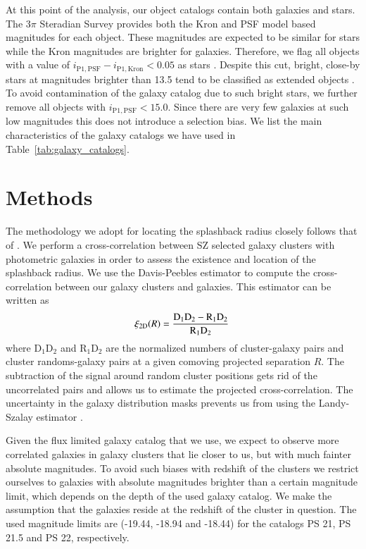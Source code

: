 \documentclass[iop, apjl, twocolappendix, numberedappendix]{emulateapj}
\begin{document}
At this point of the analysis, our object catalogs contain both
galaxies and stars. The 3$\pi$ Steradian Survey provides both the
Kron and PSF model based magnitudes for each object. These
magnitudes are expected to be similar for stars while the Kron
magnitudes are brighter for galaxies. Therefore, we flag all objects
with a value of $i_{\mathrm{P1,PSF}} - i_{\mathrm{P1,Kron}}< 0.05$
as stars \citep{farrow2013pan}. Despite this cut, bright, close-by
stars at magnitudes brighter than 13.5 tend to be classified as
extended objects \citep{chambers2016pan}. To avoid contamination of
the galaxy catalog due to such bright stars, we further remove all
objects with $i_{\mathrm{P1,PSF}} < 15.0$. Since there are very few
galaxies at such low magnitudes this does not introduce a selection
bias. We list the main characteristics of the galaxy catalogs we
have used in Table~\ref{tab:galaxy_catalogs}.

\section{Methods}
\label{sec:estimators}
The methodology we adopt for locating the splashback radius closely
follows that of \citet{more2016detection}. We perform a
cross-correlation between SZ selected galaxy clusters with photometric
galaxies in order to assess the existence and location of the
splashback radius. We use the Davis-Peebles estimator
\citep{davis1983survey} to compute the cross-correlation between our
galaxy clusters and galaxies. This estimator can be written as
\begin{equation}
\xi_{\rm 2D}(R) = \frac{\rm D_1D_2-R_1D_2}{\rm R_1D_2}\,
\end{equation}
where D$_1$D$_2$ and R$_1$D$_2$ are the normalized numbers of
cluster-galaxy pairs and cluster randoms-galaxy pairs at a given
comoving projected separation $R$. The subtraction of the signal
around random cluster positions gets rid of the uncorrelated pairs and allows
us to estimate the projected cross-correlation. The uncertainty in the galaxy
distribution masks prevents us from using the Landy-Szalay estimator \citep{landy1993bias}. 

Given the flux limited galaxy catalog that we use, we expect to
observe more correlated galaxies in galaxy clusters that lie closer
to us, but with much fainter absolute magnitudes. To avoid
such biases with redshift of the clusters we restrict ourselves to
galaxies with absolute magnitudes brighter than a certain magnitude
limit, which depends on the depth of the used galaxy catalog. We
make the assumption that the galaxies reside at the redshift of the
cluster in question. The used magnitude limits are (-19.44, -18.94
and -18.44) for the catalogs PS 21, PS 21.5 and PS 22, respectively.
\end{document}
